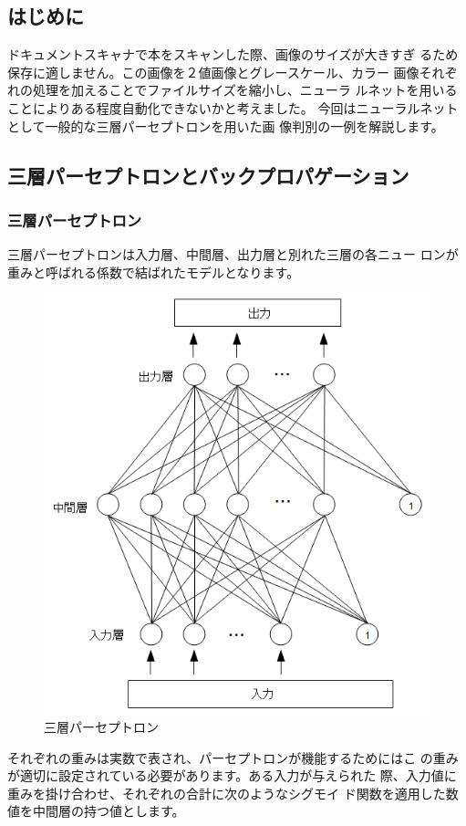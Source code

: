 \documentclass[mingoth,a4paper]{jsarticle}
\begin{document}
\subsection{はじめに}

ドキュメントスキャナで本をスキャンした際、画像のサイズが大きすぎ
るため保存に適しません。この画像を２値画像とグレースケール、カラー
画像それぞれの処理を加えることでファイルサイズを縮小し、ニューラ
ルネットを用いることによりある程度自動化できないかと考えました。
今回はニューラルネットとして一般的な三層パーセプトロンを用いた画
像判別の一例を解説します。

\subsection{三層パーセプトロンとバックプロパゲーション}

\subsubsection{三層パーセプトロン}

三層パーセプトロンは入力層、中間層、出力層と別れた三層の各ニュー
ロンが重みと呼ばれる係数で結ばれたモデルとなります。

\begin{figure}[H]
\begin{center}
\caption{三層パーセプトロン}
\includegraphics[width=0.45\hsize]{image201003/neuralnet01.png}
\end{center}
\end{figure}

それぞれの重みは実数で表され、パーセプトロンが機能するためにはこ
の重みが適切に設定されている必要があります。ある入力が与えられた
際、入力値に重みを掛け合わせ、それぞれの合計に次のようなシグモイ
ド関数を適用した数値を中間層の持つ値とします。
\end{document}
